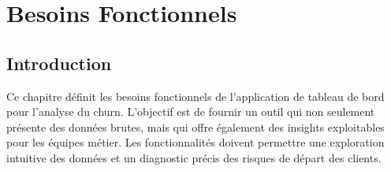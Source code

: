 \chapter{Besoins Fonctionnels}
\label{chap:besoins_fonctionnels}

\section{Introduction}
Ce chapitre définit les besoins fonctionnels de l'application de tableau de bord pour l'analyse du churn. L'objectif est de fournir un outil qui non seulement présente des données brutes, mais qui offre également des insights exploitables pour les équipes métier. Les fonctionnalités doivent permettre une exploration intuitive des données et un diagnostic précis des risques de départ des clients.

